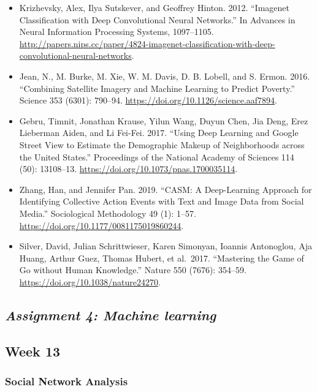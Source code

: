 \documentclass[
  10pt,
]{article}
\providecommand{\tightlist}{%
  \setlength{\itemsep}{0pt}\setlength{\parskip}{0pt}}
\begin{document}
\begin{itemize}
\tightlist
\item
  Krizhevsky, Alex, Ilya Sutskever, and Geoffrey Hinton. 2012.
  ``Imagenet Classification with Deep Convolutional Neural Networks.''
  In Advances in Neural Information Processing Systems, 1097--1105.
  \url{http://papers.nips.cc/paper/4824-imagenet-classification-with-deep-convolutional-neural-networks}.
\item
  Jean, N., M. Burke, M. Xie, W. M. Davis, D. B. Lobell, and S. Ermon.
  2016. ``Combining Satellite Imagery and Machine Learning to Predict
  Poverty.'' Science 353 (6301): 790--94.
  \url{https://doi.org/10.1126/science.aaf7894}.
\item
  Gebru, Timnit, Jonathan Krause, Yilun Wang, Duyun Chen, Jia Deng, Erez
  Lieberman Aiden, and Li Fei-Fei. 2017. ``Using Deep Learning and
  Google Street View to Estimate the Demographic Makeup of Neighborhoods
  across the United States.'' Proceedings of the National Academy of
  Sciences 114 (50): 13108--13.
  \url{https://doi.org/10.1073/pnas.1700035114}.
\item
  Zhang, Han, and Jennifer Pan. 2019. ``CASM: A Deep-Learning Approach
  for Identifying Collective Action Events with Text and Image Data from
  Social Media.'' Sociological Methodology 49 (1): 1--57.
  \url{https://doi.org/10.1177/0081175019860244}.
\item
  Silver, David, Julian Schrittwieser, Karen Simonyan, Ioannis
  Antonoglou, Aja Huang, Arthur Guez, Thomas Hubert, et al.~2017.
  ``Mastering the Game of Go without Human Knowledge.'' Nature 550
  (7676): 354--59. \url{https://doi.org/10.1038/nature24270}.
\end{itemize}

\hypertarget{assignment-4-machine-learning}{%
\subsection{\texorpdfstring{\emph{Assignment 4: Machine
learning}}{Assignment 4: Machine learning}}\label{assignment-4-machine-learning}}

\hypertarget{week-13}{%
\subsection{Week 13}\label{week-13}}

\hypertarget{social-network-analysis}{%
\subsubsection{Social Network Analysis}\label{social-network-analysis}}
\end{document}
